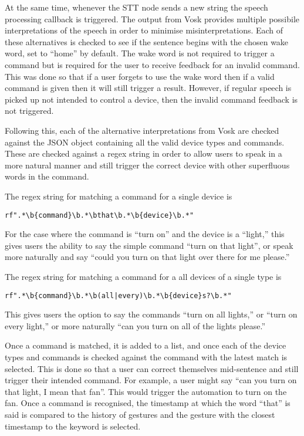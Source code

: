 At the same time, whenever the STT node sends a new string the speech processing callback is triggered.
The output from Vosk provides multiple possibile interpretations of the speech in order to minimise misinterpretations.
Each of these alternatives is checked to see if the sentence begins with the chosen wake word, set to ``home'' by default.
The wake word is not required to trigger a command but is required for the user to receive feedback for an invalid command.
This was done so that if a user forgets to use the wake word then if a valid command is given then it will still trigger a result.
However, if regular speech is picked up not intended to control a device, then the invalid command feedback is not triggered.

Following this, each of the alternative interpretations from Vosk are checked against the JSON object containing all the valid device types and commands.
These are checked against a regex string in order to allow users to speak in a more natural manner and still trigger the correct device with other superfluous words in the command.

The regex string for matching a command for a single device is
\begin{center}
    \texttt{rf".*\textbackslash b\{command\}\textbackslash b.*\textbackslash bthat\textbackslash b.*\textbackslash b\{device\}\textbackslash b.*"}
\end{center}
For the case where the command is ``turn on'' and the device is a ``light,'' this gives users the ability to say the simple command ``turn on that light'', or speak more naturally and say ``could you turn on that light over there for me please.''

The regex string for matching a command for a all devices of a single type is
\begin{center}
    \texttt{rf".*\textbackslash b\{command\}\textbackslash b.*\textbackslash b(all|every)\textbackslash b.*\textbackslash b\{device\}s?\textbackslash b.*"}
\end{center}
This gives users the option to say the commands ``turn on all lights,'' or ``turn on every light,'' or more naturally ``can you turn on all of the lights please.''

Once a command is matched, it is added to a list, and once each of the device types and commands is checked against the command with the latest match is selected.
This is done so that a user can correct themselves mid-sentence and still trigger their intended command.
For example, a user might say ``can you turn on that light, I mean that fan''.
This would trigger the automation to turn on the fan.
Once a command is recognised, the timestamp at which the word ``that'' is said is compared to the history of gestures and the gesture with the closest timestamp to the keyword is selected.

